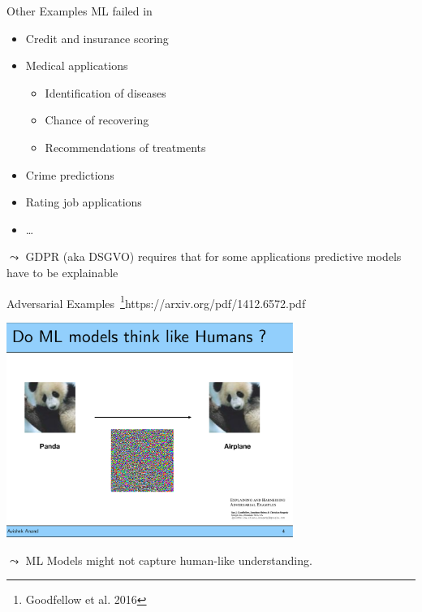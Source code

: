 \documentclass[11pt,compress,t,notes=noshow, xcolor=table]{beamer}
\begin{document}
\begin{vbframe}{Other Examples ML failed in}

    \begin{itemize}
        \item Credit and insurance scoring
        
        \item Medical applications
        \begin{itemize}
            \item Identification of diseases
            \item Chance of recovering
            \item Recommendations of treatments
        \end{itemize}
        
        \item Crime predictions
        
        \item Rating job applications
        
        \item \ldots
    \end{itemize}

    
    \bigskip

    $\leadsto$ GDPR (aka DSGVO) requires that for some applications predictive models have to be explainable        
	
\end{vbframe}



\begin{vbframe}{Adversarial Examples~\footnote{Goodfellow et al. 2016}{https://arxiv.org/pdf/1412.6572.pdf}}
    
    \centering
    \includegraphics[width=0.7\textwidth]{figure/panda-airplane.pdf}
	
	$\leadsto$ ML Models might not capture human-like understanding.        
	
\end{vbframe}
\end{document}
